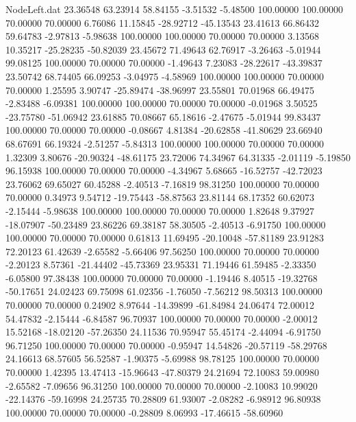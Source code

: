 \begin{filecontents}{NodeLeft.dat}
  23.36548   63.23914   58.84155    -3.51532   -5.48500  100.00000  100.00000   70.00000   70.00000    6.76086   11.15845  -28.92712  -45.13543
  23.41613   66.86432   59.64783    -2.97813   -5.98638  100.00000  100.00000   70.00000   70.00000    3.13568   10.35217  -25.28235  -50.82039
  23.45672   71.49643   62.76917    -3.26463   -5.01944   99.08125  100.00000   70.00000   70.00000   -1.49643    7.23083  -28.22617  -43.39837
  23.50742   68.74405   66.09253    -3.04975   -4.58969  100.00000  100.00000   70.00000   70.00000    1.25595    3.90747  -25.89474  -38.96997
  23.55801   70.01968   66.49475    -2.83488   -6.09381  100.00000  100.00000   70.00000   70.00000   -0.01968    3.50525  -23.75780  -51.06942
  23.61885   70.08667   65.18616    -2.47675   -5.01944   99.83437  100.00000   70.00000   70.00000   -0.08667    4.81384  -20.62858  -41.80629
  23.66940   68.67691   66.19324    -2.51257   -5.84313  100.00000  100.00000   70.00000   70.00000    1.32309    3.80676  -20.90324  -48.61175
  23.72006   74.34967   64.31335    -2.01119   -5.19850   96.15938  100.00000   70.00000   70.00000   -4.34967    5.68665  -16.52757  -42.72023
  23.76062   69.65027   60.45288    -2.40513   -7.16819   98.31250  100.00000   70.00000   70.00000    0.34973    9.54712  -19.75443  -58.87563
  23.81144   68.17352   60.62073    -2.15444   -5.98638  100.00000  100.00000   70.00000   70.00000    1.82648    9.37927  -18.07907  -50.23489
  23.86226   69.38187   58.30505    -2.40513   -6.91750  100.00000  100.00000   70.00000   70.00000    0.61813   11.69495  -20.10048  -57.81189
  23.91283   72.20123   61.42639    -2.65582   -5.66406   97.56250  100.00000   70.00000   70.00000   -2.20123    8.57361  -21.44402  -45.73369
  23.95331   71.19446   61.59485    -2.33350   -6.05800   97.38438  100.00000   70.00000   70.00000   -1.19446    8.40515  -19.32768  -50.17651
  24.02423   69.75098   61.02356    -1.76050   -7.56212   98.50313  100.00000   70.00000   70.00000    0.24902    8.97644  -14.39899  -61.84984
  24.06474   72.00012   54.47832    -2.15444   -6.84587   96.70937  100.00000   70.00000   70.00000   -2.00012   15.52168  -18.02120  -57.26350
  24.11536   70.95947   55.45174    -2.44094   -6.91750   96.71250  100.00000   70.00000   70.00000   -0.95947   14.54826  -20.57119  -58.29768
  24.16613   68.57605   56.52587    -1.90375   -5.69988   98.78125  100.00000   70.00000   70.00000    1.42395   13.47413  -15.96643  -47.80379
  24.21694   72.10083   59.00980    -2.65582   -7.09656   96.31250  100.00000   70.00000   70.00000   -2.10083   10.99020  -22.14376  -59.16998
  24.25735   70.28809   61.93007    -2.08282   -6.98912   96.80938  100.00000   70.00000   70.00000   -0.28809    8.06993  -17.46615  -58.60960

\end{filecontents}
